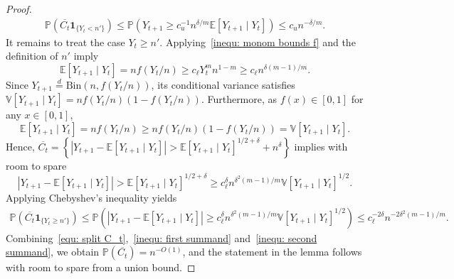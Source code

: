 \documentclass[11pt]{article}
\newcommand{\Bin}{\mathrm{Bin}}
\newcommand{\Prob}{\mathbb{P}}
\numberwithin{theorem}{section}
\begin{document}
\begin{proof}
\begin{align}
    \Prob(\overline{C_t}\mathbf{1}_{\{Y_t < n'\}}) \leq \Prob(Y_{t+1} \geq c_u^{-1} n^{\delta/m}  \mathbb{E}[Y_{t+1}\mid Y_t]) \leq c_un^{-\delta/m}.
    \end{align}
    It remains to treat the case $Y_t \geq n'$. Applying~\eqref{inequ: monom bounds f} and the definition of $n'$ imply
    \[
    \mathbb{E}[Y_{t+1}\mid Y_t] = nf(Y_t/n) \geq c_\ell Y_t^m n^{1-m} \geq c_\ell n^{\delta(m-1)/m}.
    \]
    Since $Y_{t+1}\stackrel{d}{=}\Bin(n,f(Y_t/n))$, its conditional variance satisfies $\mathbb{V}[Y_{t+1}\mid Y_t]=nf(Y_t/n)(1-f(Y_t/n))$.
    Furthermore, as $f(x)\in[0,1]$ for any $x\in[0,1]$,
    \[
    \mathbb{E}[Y_{t+1}\mid Y_t] = nf(Y_t/n) \geq nf(Y_t/n)(1-f(Y_t/n)) = \mathbb{V}[Y_{t+1}\mid Y_t].
    \]
    Hence, $\overline{C_t}=\left\{\left|Y_{t+1} - \mathbb{E}[Y_{t+1}\mid Y_t] \right| >  \mathbb{E}[Y_{t+1}\mid Y_t]^{1/2+\delta} + n^\delta \right\}$ implies with room to spare
    \[
    \left| Y_{t+1} - \mathbb{E}[Y_{t+1}\mid Y_t] \right|> \mathbb{E}[Y_{t+1}\mid Y_t]^{1/2+\delta} \geq c_\ell^{\delta}n^{\delta^2 (m-1)/m} \mathbb{V}[Y_{t+1}\mid Y_t]^{1/2}.
    \]
    Applying Chebyshev's inequality yields 
    \begin{align}\label{inequ: second summand}
    \Prob(\overline{C_t}\mathbf{1}_{\{Y_t \geq n'\}}) \leq \Prob(\left| Y_{t+1} - \mathbb{E}[Y_{t+1}\mid Y_t] \right|\geq c_\ell^{\delta}n^{\delta^2 (m-1)/m} \mathbb{V}[Y_{t+1}\mid Y_t]^{1/2}) \leq  c_\ell^{-2\delta}n^{-2\delta^2(m-1)/m}.
    \end{align}
    Combining~\eqref{equ: split C_t},~\eqref{inequ: first summand} and~\eqref{inequ: second summand}, we obtain $\Prob(\overline{C_t}) = n^{-O(1)}$, and the statement in the lemma follows with room to spare from a union bound.
\end{proof}
\end{document}

